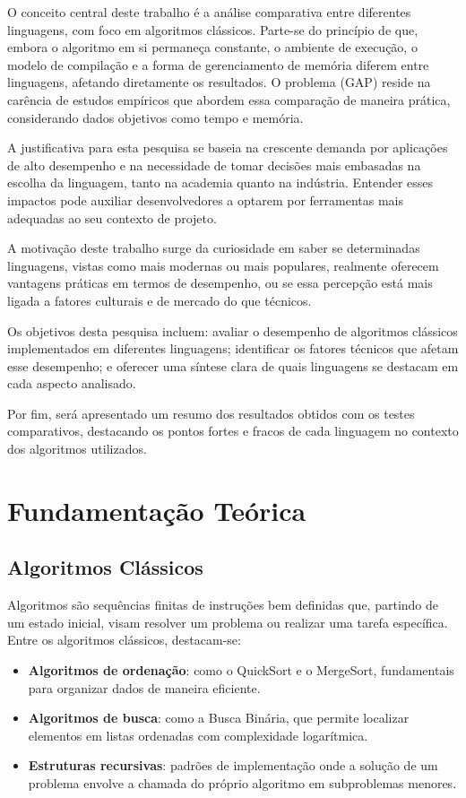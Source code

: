 \documentclass[12pt,oneside,a4paper]{report}
\begin{document}
O conceito central deste trabalho é a análise comparativa entre diferentes linguagens, com foco em algoritmos clássicos. Parte-se do princípio de que, embora o algoritmo em si permaneça constante, o ambiente de execução, o modelo de compilação e a forma de gerenciamento de memória diferem entre linguagens, afetando diretamente os resultados. O problema (GAP) reside na carência de estudos empíricos que abordem essa comparação de maneira prática, considerando dados objetivos como tempo e memória.

A justificativa para esta pesquisa se baseia na crescente demanda por aplicações de alto desempenho e na necessidade de tomar decisões mais embasadas na escolha da linguagem, tanto na academia quanto na indústria. Entender esses impactos pode auxiliar desenvolvedores a optarem por ferramentas mais adequadas ao seu contexto de projeto.

A motivação deste trabalho surge da curiosidade em saber se determinadas linguagens, vistas como mais modernas ou mais populares, realmente oferecem vantagens práticas em termos de desempenho, ou se essa percepção está mais ligada a fatores culturais e de mercado do que técnicos.

Os objetivos desta pesquisa incluem: avaliar o desempenho de algoritmos clássicos implementados em diferentes linguagens; identificar os fatores técnicos que afetam esse desempenho; e oferecer uma síntese clara de quais linguagens se destacam em cada aspecto analisado.

Por fim, será apresentado um resumo dos resultados obtidos com os testes comparativos, destacando os pontos fortes e fracos de cada linguagem no contexto dos algoritmos utilizados.

\chapter{Fundamentação Teórica}

\section{Algoritmos Clássicos}

Algoritmos são sequências finitas de instruções bem definidas que, partindo de um estado inicial, visam resolver um problema ou realizar uma tarefa específica. Entre os algoritmos clássicos, destacam-se:

\begin{itemize}
    \item \textbf{Algoritmos de ordenação}: como o QuickSort e o MergeSort, fundamentais para organizar dados de maneira eficiente.
    \item \textbf{Algoritmos de busca}: como a Busca Binária, que permite localizar elementos em listas ordenadas com complexidade logarítmica.
    \item \textbf{Estruturas recursivas}: padrões de implementação onde a solução de um problema envolve a chamada do próprio algoritmo em subproblemas menores.
\end{itemize}
\end{document}
